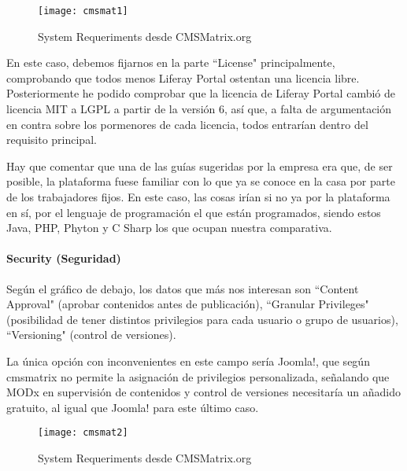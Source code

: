 \begin{figure}
\begin{narrow}{-0.2\linewidth}{-0.2\linewidth}
\centering
\texttt{[image: cmsmat1]}
\caption{System Requeriments desde CMSMatrix.org}
\end{narrow}
\label{fig:cmsmat1}
\end{figure}

\par En este caso, debemos fijarnos en la parte ``License" principalmente, comprobando que todos menos Liferay Portal ostentan una licencia libre. Posteriormente he podido comprobar que la licencia de Liferay Portal cambió de licencia MIT a LGPL a partir de la versión 6\cite{references:liferaylicense}, así que, a falta de argumentación en contra sobre los pormenores de cada licencia, todos entrarían dentro del requisito principal.

\par Hay que comentar que una de las guías sugeridas por la empresa era que, de ser posible, la plataforma fuese familiar con lo que ya se conoce en la casa por parte de los trabajadores fijos. En este caso, las cosas irían si no ya por la plataforma en sí, por el lenguaje de programación el que están programados, siendo estos Java, PHP, Phyton y C Sharp los que ocupan nuestra comparativa.

\paragraph{Security (Seguridad)}

\par Según el gráfico de debajo, los datos que más nos interesan son ``Content Approval" (aprobar contenidos antes de publicación), ``Granular Privileges" (posibilidad de tener distintos privilegios para cada usuario o grupo de usuarios), ``Versioning" (control de versiones).

\par La única opción con inconvenientes en este campo sería Joomla!, que según cmsmatrix no permite la asignación de privilegios personalizada, señalando que MODx en supervisión de contenidos y control de versiones necesitaría un añadido gratuito, al igual que Joomla! para este último caso.

\begin{figure}
\begin{narrow}{-0.2\linewidth}{-0.2\linewidth}
\centering
\texttt{[image: cmsmat2]}
\caption{System Requeriments desde CMSMatrix.org}
\end{narrow}
\label{fig:cmsmat1}
\end{figure}

